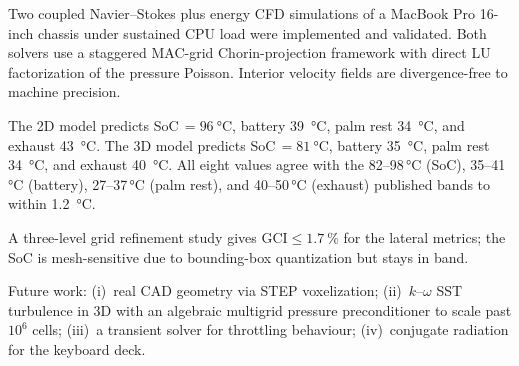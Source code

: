 \documentclass[10pt,twocolumn,letterpaper]{article}
\begin{document}
Two coupled Navier--Stokes plus energy CFD simulations of a
MacBook Pro 16-inch chassis under sustained CPU load were
implemented and validated. Both solvers use a staggered MAC-grid
Chorin-projection framework with direct LU factorization of the
pressure Poisson. Interior velocity fields are divergence-free to
machine precision.

The 2D model predicts SoC\,$=\SI{96}{\celsius}$, battery
\SI{39}{\celsius}, palm rest \SI{34}{\celsius}, and exhaust
\SI{43}{\celsius}. The 3D model predicts
SoC\,$=\SI{81}{\celsius}$, battery \SI{35}{\celsius}, palm rest
\SI{34}{\celsius}, and exhaust \SI{40}{\celsius}. All eight values agree with the
82--98\,\si{\celsius} (SoC), 35--41\,\si{\celsius} (battery),
27--37\,\si{\celsius} (palm rest), and 40--50\,\si{\celsius}
(exhaust) published bands to within \SI{1.2}{\celsius}.

A three-level grid refinement study gives
$\mathrm{GCI} \le \SI{1.7}{\percent}$ for the lateral metrics; the
SoC is mesh-sensitive due to bounding-box quantization but stays
in band.

Future work: (i)~real CAD geometry via STEP voxelization;
(ii)~$k$--$\omega$ SST turbulence in 3D with an algebraic multigrid
pressure preconditioner to scale past $10^{6}$ cells; (iii)~a
transient solver for throttling behaviour; (iv)~conjugate radiation
for the keyboard deck.
\end{document}
